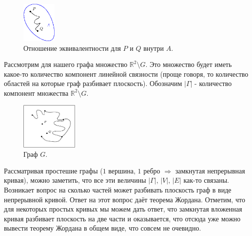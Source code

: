\documentclass[12pt]{article}
\newcommand{\MR}{\mathbb{R}}
\theoremstyle{definition}
\begin{document}
\begin{figure}[H]
	\centering
	\includegraphics[width=0.15\textwidth]{GATL2_11.eps}
	\caption{Отношение эквивалентности для $P$ и $Q$ внутри $A$.}
	\label{2_11}
\end{figure}
Рассмотрим для нашего графа множество $\MR^2 \setminus G$. Это множество будет иметь какое-то количество компонент линейной связности (проще говоря, то количество областей на которые граф разбивает плоскость). Обозначим $|\Gamma|$ - количество компонент множества $\MR^2 \setminus G$.
\begin{figure}[H]
	\centering
	\includegraphics[width=0.25\textwidth]{GATL2_12.eps}
	\caption{Граф $G$.}
	\label{2_12}
\end{figure}
Рассматривая простешие графы ($1$ вершина, $1$ ребро $\Rightarrow$ замкнутая непрерывная кривая), можно заметить, что все эти величины $|\Gamma|, \, |V|, \, |E|$ как-то связаны. Возникает вопрос на сколько частей может разбивать плоскость граф в виде непрерывной кривой. Ответ на этот вопрос даёт теорема Жордана. Отметим, что для некоторых простых кривых мы можем дать ответ, что замкнутая вложенная кривая разбивает плоскость на две части и оказывается, что отсюда уже можно вывести теорему Жордана в общем виде, что совсем не очевидно.
 
\end{document}
